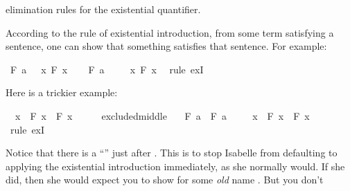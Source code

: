 \begin{isabellebody}
\begin{isamarkuptext}
elimination rules for the existential quantifier.%
\end{isamarkuptext}\isamarkuptrue%
%
\isamarkuptrue%
%
\begin{isamarkuptext}%
According to the rule of existential introduction, from some term satisfying a sentence,
one can show that something satisfies that sentence. For example:%
\end{isamarkuptext}\isamarkuptrue%
\isamarkupfalse%
\ {\isachardoublequoteopen}F\ a\ {\isasymlongrightarrow}\ {\isacharparenleft}{\isasymexists}\ x{\isachardot}\ F\ x{\isacharparenright}{\isachardoublequoteclose}\isanewline
%
\isadelimproof
%
\endisadelimproof
%
\isatagproof
{}\isamarkupfalse%
\isanewline
\ \ \isamarkupfalse%
\ {\isachardoublequoteopen}F\ a{\isachardoublequoteclose}\isanewline
\ \ \isamarkupfalse%
\ {\isachardoublequoteopen}{\isasymexists}\ x{\isachardot}\ F\ x{\isachardoublequoteclose}\ \isamarkupfalse%
\ {\isacharparenleft}rule\ exI{\isacharparenright}\isanewline
{}\isamarkupfalse%
%
\endisatagproof
{\isafoldproof}%
%
\isadelimproof
%
\endisadelimproof
%
\begin{isamarkuptext}%
Here is a trickier example:%
\end{isamarkuptext}\isamarkuptrue%
\isamarkupfalse%
\ {\isachardoublequoteopen}{\isasymexists}\ x{\isachardot}\ {\isasymnot}\ F\ x\ {\isasymor}\ F\ x{\isachardoublequoteclose}\isanewline
%
\isadelimproof
%
\endisadelimproof
%
\isatagproof
{}\isamarkupfalse%
\ {\isacharminus}\isanewline
\ \ \isamarkupfalse%
\ excluded{\isacharunderscore}middle\ \isamarkupfalse%
\ {\isachardoublequoteopen}{\isasymnot}\ F\ a\ {\isasymor}\ F\ a{\isachardoublequoteclose}\isacommand{{\isachardot}}\isamarkupfalse%
\isanewline
\ \ \isamarkupfalse%
\ {\isachardoublequoteopen}{\isasymexists}\ x{\isachardot}\ {\isasymnot}\ F\ x\ {\isasymor}\ F\ x{\isachardoublequoteclose}\ \isamarkupfalse%
\ {\isacharparenleft}rule\ exI{\isacharparenright}\isanewline
{}\isamarkupfalse%
%
\endisatagproof
{\isafoldproof}%
%
\isadelimproof
%
\endisadelimproof
%
\begin{isamarkuptext}%
Notice that there is a ``\isa{{\isacharminus}}'' just after . This is to stop Isabelle from
defaulting to applying the existential introduction immediately, as she normally would. If she did, then
she would expect you to show  for some \emph{old} name . But you don't

\end{isamarkuptext}
\end{isabellebody}
